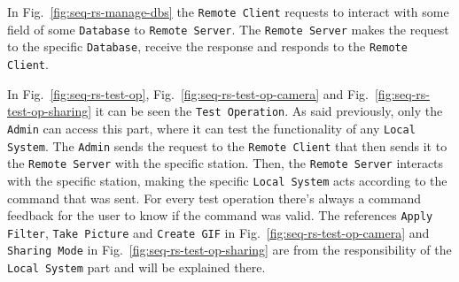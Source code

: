 In Fig.~\ref{fig:seq-rs-manage-dbs} the \texttt{Remote Client} requests to interact with some field of some \texttt{Database} to \texttt{Remote Server}.
The \texttt{Remote Server} makes the request to the specific \texttt{Database}, receive the response and responds to the \texttt{Remote Client}.

In Fig.~\ref{fig:seq-rs-test-op}, Fig.~\ref{fig:seq-rs-test-op-camera} and Fig.~\ref{fig:seq-rs-test-op-sharing} it can be seen the \texttt{Test Operation}.
As said previously, only the \texttt{Admin} can access this part, where it can test the functionality of any \texttt{Local System}.
The \texttt{Admin} sends the request to the \texttt{Remote Client} that then sends it to the \texttt{Remote Server} with the specific station.
Then, the \texttt{Remote Server} interacts with the specific station, making the specific \texttt{Local System} acts according to the command that was sent.
For every test operation there's always a command feedback for the user to know if the command was valid.
The references \texttt{Apply Filter}, \texttt{Take Picture} and \texttt{Create GIF} in Fig.~\ref{fig:seq-rs-test-op-camera} and \texttt{Sharing Mode} in Fig.~\ref{fig:seq-rs-test-op-sharing} are from the responsibility of the \texttt{Local System} part and will be explained there.

